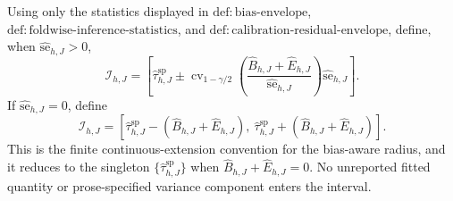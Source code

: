 Using only the statistics displayed in \(\mathrm{def:bias\text{-}envelope}\), \(\mathrm{def:foldwise\text{-}inference\text{-}statistics}\), and \(\mathrm{def:calibration\text{-}residual\text{-}envelope}\), define, when \(\widehat{\mathrm{se}}_{h,J}>0\), \[\mathcal I_{h,J}=\left[\widehat\tau^{\mathrm{sp}}_{h,J}\pm\operatorname{cv}_{1-\gamma/2}\!\left(\frac{\widehat B_{h,J}+\widehat E_{h,J}}{\widehat{\mathrm{se}}_{h,J}}\right)\widehat{\mathrm{se}}_{h,J}\right].\] If \(\widehat{\mathrm{se}}_{h,J}=0\), define \[\mathcal I_{h,J}=\left[\widehat\tau^{\mathrm{sp}}_{h,J}-(\widehat B_{h,J}+\widehat E_{h,J}),\ \widehat\tau^{\mathrm{sp}}_{h,J}+(\widehat B_{h,J}+\widehat E_{h,J})\right].\] This is the finite continuous-extension convention for the bias-aware radius, and it reduces to the singleton \(\{\widehat\tau^{\mathrm{sp}}_{h,J}\}\) when \(\widehat B_{h,J}+\widehat E_{h,J}=0\). No unreported fitted quantity or prose-specified variance component enters the interval.